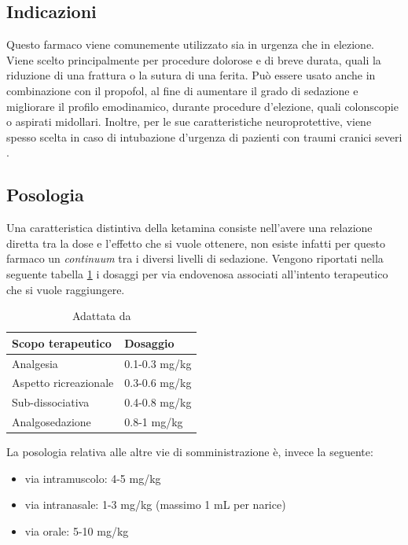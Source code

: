 \subsection*{Indicazioni}

Questo farmaco viene comunemente utilizzato sia in urgenza che in elezione. Viene scelto principalmente per procedure dolorose e di breve durata, quali la riduzione di una frattura o la sutura di una ferita. Può essere usato anche in combinazione con il propofol, al fine di aumentare il grado di sedazione e migliorare il profilo emodinamico, durante procedure d'elezione, quali colonscopie o aspirati midollari. Inoltre, per le sue caratteristiche neuroprotettive, viene spesso scelta in caso di intubazione d'urgenza di pazienti con traumi cranici severi \cite{Simeupsedazione}.

\subsection*{Posologia}

Una caratteristica distintiva della ketamina consiste nell'avere una relazione diretta tra la dose e l'effetto che si vuole ottenere, non esiste infatti per questo farmaco un \emph{continuum} tra i diversi livelli di sedazione. Vengono riportati nella seguente tabella \ref{tab:1} i dosaggi per via endovenosa associati all'intento terapeutico che si vuole raggiungere.

\bgroup
\def\arraystretch{1.5}
\begin{table}[!h]
    \centering
    \begin{tabular}{|l|l|}
       Scopo terapeutico     & Dosaggio \\ \hline
       Analgesia & 0.1-0.3 mg/kg  \\
       Aspetto ricreazionale & 0.3-0.6 mg/kg \\
       Sub-dissociativa & 0.4-0.8 mg/kg \\
       Analgosedazione & 0.8-1 mg/kg 
    \end{tabular}
    \caption{Adattata da \cite{Simeupsedazione}}
    \label{tab:1}
\end{table}
\egroup


La posologia relativa alle altre vie di somministrazione è, invece la seguente: 
\begin{itemize}
    \item via intramuscolo: 4-5 mg/kg
    \item via intranasale: 1-3 mg/kg (massimo 1 mL per narice)
    \item via orale: 5-10 mg/kg
\end{itemize}

